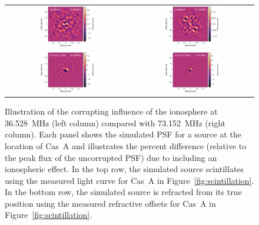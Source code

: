 \begin{bibunit}
\begin{figure}[t]
    \centering
    \begin{tabular}{cc}
        \includegraphics[width=0.45\textwidth]{figures/chapter3/scintillation-4} &
        \includegraphics[width=0.45\textwidth]{figures/chapter3/scintillation-18} \\
        \includegraphics[width=0.45\textwidth]{figures/chapter3/refraction-4} &
        \includegraphics[width=0.45\textwidth]{figures/chapter3/refraction-18} \\
    \end{tabular}
    \caption{
        Illustration of the corrupting influence of the ionosphere at 36.528~MHz (left column)
        compared with 73.152~MHz (right column). Each panel shows the simulated PSF for a source at
        the location of Cas~A and illustrates the percent difference (relative to the peak flux of
        the uncorrupted PSF) due to including an ionospheric effect.  In the top row, the simulated
        source scintillates using the measured light curve for Cas~A in
        Figure~\ref{fig:scintillation}. In the bottom row, the simulated source is refracted from
        its true position using the measured refractive offsets for Cas~A in
        Figure~\ref{fig:scintillation}.
    }
    \label{fig:ionospheric-simulations}
\end{figure}


\end{bibunit}
